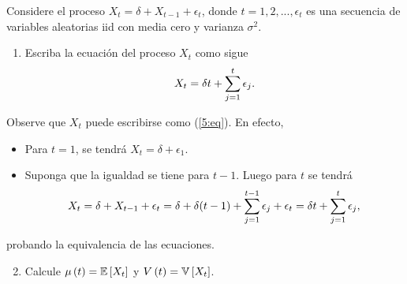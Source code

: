 \documentclass[../main.tex]{subfiles}
\begin{document}
    \begin{enunciado}
        Considere el proceso $X_t = \delta + X_{t-1} + \epsilon_t$, donde $t = 1,2,...,\epsilon_t$ es una secuencia de variables aleatorias iid con media cero y varianza $\sigma^2$.
        \begin{enumerate}
            \item Escriba la ecuación del proceso $X_t$ como sigue
                \begin{align}
                    \label{5:eq}
                	X_t = \delta t + \sum_{j = 1}^{t} \epsilon_j.
                \end{align}
        \end{enumerate}

    \end{enunciado}
    \begin{demostracion}
        Observe que $X_t$ puede escribirse como (\ref{5:eq}). En efecto,
            \begin{itemize}
            	\item Para $t = 1$, se tendrá $X_t = \delta + \epsilon_1$.
            	\item Suponga que la igualdad se tiene para $t - 1$. Luego para $t$ se tendrá
                    \begin{align*}
                    	X_t = \delta + X_{t-1} + \epsilon_t = \delta + \delta (t-1) + \sum_{j = 1}^{t-1} \epsilon_j + \epsilon_t = \delta t + \sum_{j = 1}^{t} \epsilon_j,
                    \end{align*}
            \end{itemize}
        probando la equivalencia de las ecuaciones.
    \end{demostracion}
    \vspace{1em}
    \begin{enunciado}
    	\begin{enumerate}
            \setcounter{enumi}{1}
    		\item Calcule $\mu\left( t \right) = \mathbb{E} \left[ X_t \right]$ y $V\left( t \right) = \mathbb{V} \left[ X_t \right]$.
    	\end{enumerate}
    \end{enunciado}
\end{document}

